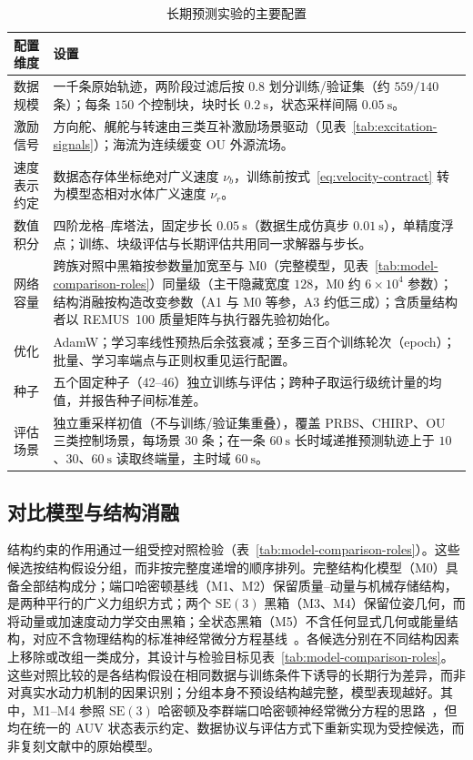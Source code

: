 \documentclass[UTF8,zihao=-4]{ctexrep}
\newcommand{\SE}{\mathrm{SE}}
\begin{document}
\begin{table}[htbp]
  \centering
  \caption{长期预测实验的主要配置}
  \label{tab:experimental-config}
  \begin{tabularx}{\textwidth}{>{\raggedright\arraybackslash}p{}>{\raggedright\arraybackslash}X}
    \toprule
    配置维度 & 设置 \\
    \midrule
    数据规模 & 一千条原始轨迹，两阶段过滤后按 \(0.8\) 划分训练/验证集（约 \(559/140\) 条）；每条 \(150\) 个控制块，块时长 \(0.2~\mathrm{s}\)，状态采样间隔 \(0.05~\mathrm{s}\)。 \\
    激励信号 & 方向舵、艉舵与转速由三类互补激励场景驱动（见表~\ref{tab:excitation-signals}）；海流为连续缓变 OU 外源流场。 \\
    速度表示约定 & 数据态存体坐标绝对广义速度 \(\nu_b\)，训练前按式~\eqref{eq:velocity-contract} 转为模型态相对水体广义速度 \(\nu_r\)。 \\
    数值积分 & 四阶龙格--库塔法，固定步长 \(0.05~\mathrm{s}\)（数据生成仿真步 \(0.01~\mathrm{s}\)），单精度浮点；训练、块级评估与长期评估共用同一求解器与步长。 \\
    网络容量 & 跨族对照中黑箱按参数量加宽至与 M0（完整模型，见表~\ref{tab:model-comparison-roles}）同量级（主干隐藏宽度 \(128\)，M0 约 \(6\times10^4\) 参数）；结构消融按构造改变参数（A1 与 M0 等参，A3 约低三成）；含质量结构者以 REMUS~100 质量矩阵与执行器先验初始化。 \\
    优化 & AdamW；学习率线性预热后余弦衰减；至多三百个训练轮次（epoch）；批量、学习率端点与正则权重见运行配置。 \\
    种子 & 五个固定种子（42--46）独立训练与评估；跨种子取运行级统计量的均值，并报告种子间标准差。 \\
    评估场景 & 独立重采样初值（不与训练/验证集重叠），覆盖 PRBS、CHIRP、OU 三类控制场景，每场景 \(30\) 条；在一条 \(60~\mathrm{s}\) 长时域递推预测轨迹上于 \(10\)、\(30\)、\(60~\mathrm{s}\) 读取终端量，主时域 \(60~\mathrm{s}\)。 \\
    \bottomrule
  \end{tabularx}
\end{table}

\subsection{对比模型与结构消融}
\label{subsec:models-ablations}

结构约束的作用通过一组受控对照检验（表~\ref{tab:model-comparison-roles}）。这些候选按结构假设分组，而非按完整度递增的顺序排列。完整结构化模型（M0）具备全部结构成分；端口哈密顿基线（M1、M2）保留质量--动量与机械存储结构，是两种平行的广义力组织方式；两个 \(\SE(3)\) 黑箱（M3、M4）保留位姿几何，而将动量或加速度动力学交由黑箱；全状态黑箱（M5）不含任何显式几何或能量结构，对应不含物理结构的标准神经常微分方程基线~\citep{chen2018neuralode}。各候选分别在不同结构因素上移除或改组一类成分，其设计与检验目标见表~\ref{tab:model-comparison-roles}。这些对照比较的是各结构假设在相同数据与训练条件下诱导的长期行为差异，而非对真实水动力机制的因果识别；分组本身不预设结构越完整，模型表现越好。其中，M1--M4 参照 \(\SE(3)\) 哈密顿及李群端口哈密顿神经常微分方程的思路~\citep{duong2021se3hamnode,duong2024liegroupphnode}，但均在统一的 AUV 状态表示约定、数据协议与评估方式下重新实现为受控候选，而非复刻文献中的原始模型。
\end{document}
